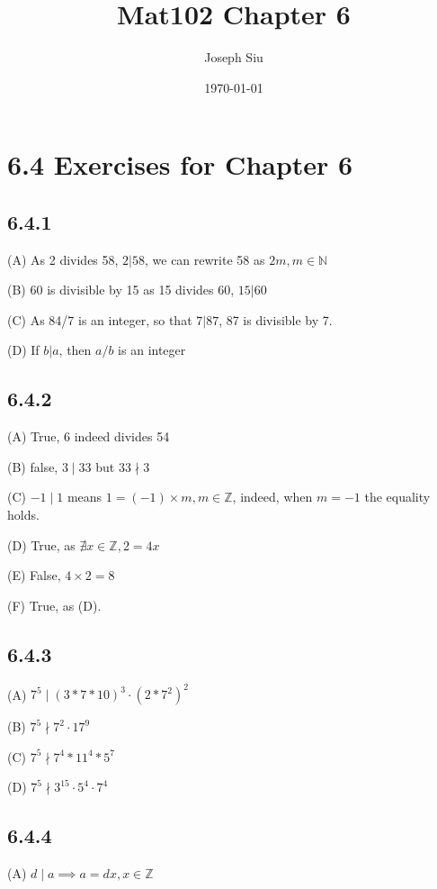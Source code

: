 \documentclass{article}
\title{Mat102 Chapter 6}
\author{Joseph Siu}
\date{\today}
\begin{document}
\maketitle

\section*{6.4 Exercises for Chapter 6}


\subsection*{6.4.1}

(A) As 2 divides 58, $2|58$, we can rewrite 58 as $2m,m\in\mathbb{N}$ 

(B) 60 is divisible by 15 as 15 divides 60, $15|60$ 

(C) As 84/7 is an integer, so that $7|87$, 87 is divisible by 7.

(D) If $b|a$, then $a/b$ is an integer

\subsection*{6.4.2}

(A) True, 6 indeed divides 54

(B) false, $3\mid33$ but $33\nmid 3$ 

(C) $-1\mid 1$ means $1=(-1)\times m,m\in\mathbb{Z}$, indeed, when $m=-1$ the equality holds. 

(D) True, as $\nexists x\in\mathbb{Z},2=4x$ 

(E) False, $4\times 2=8$

(F) True, as (D).

\subsection*{6.4.3}

(A) $7^5\mid(3*7*10)^3\cdot (2*7^2)^2$ 

(B) $7^5\nmid 7^2\cdot 17^9$

(C) $7^5\nmid 7^4*11^4*5^7$

(D) $7^5\nmid 3^{15}\cdot 5^4\cdot 7^4$

\subsection*{6.4.4}

(A) $d\mid a\implies a=dx,x\in\mathbb{Z}$
\end{document}
